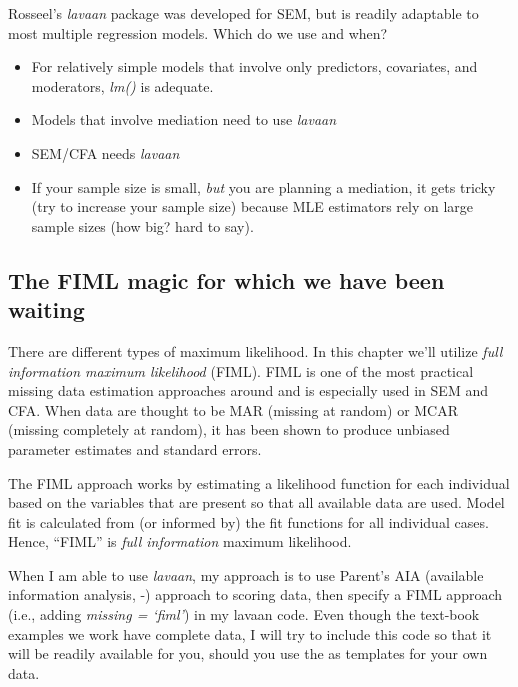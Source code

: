 \documentclass[
]{book}
\providecommand{\tightlist}{%
  \setlength{\itemsep}{0pt}\setlength{\parskip}{0pt}}
\begin{document}
Rosseel's \citeyearpar{rosseel_lavaan_2020} \emph{lavaan} package was developed for SEM, but is readily adaptable to most multiple regression models. Which do we use and when?

\begin{itemize}
\tightlist
\item
  For relatively simple models that involve only predictors, covariates, and moderators, \emph{lm()} is adequate.
\item
  Models that involve mediation need to use \emph{lavaan}
\item
  SEM/CFA needs \emph{lavaan}
\item
  If your sample size is small, \emph{but} you are planning a mediation, it gets tricky (try to increase your sample size) because MLE estimators rely on large sample sizes (how big? hard to say).
\end{itemize}

\hypertarget{the-fiml-magic-for-which-we-have-been-waiting}{%
\subsection{The FIML magic for which we have been waiting}\label{the-fiml-magic-for-which-we-have-been-waiting}}

There are different types of maximum likelihood. In this chapter we'll utilize \emph{full information maximum likelihood} (FIML). FIML is one of the most practical missing data estimation approaches around and is especially used in SEM and CFA. When data are thought to be MAR (missing at random) or MCAR (missing completely at random), it has been shown to produce unbiased parameter estimates and standard errors.

The FIML approach works by estimating a likelihood function for each individual based on the variables that are present so that all available data are used. Model fit is calculated from (or informed by) the fit functions for all individual cases. Hence, ``FIML'' is \emph{full information} maximum likelihood.

When I am able to use \emph{lavaan}, my approach is to use Parent's AIA (available information analysis, -\citet{parent_handling_2013}) approach to scoring data, then specify a FIML approach (i.e., adding \emph{missing = `fiml'}) in my lavaan code. Even though the text-book examples we work have complete data, I will try to include this code so that it will be readily available for you, should you use the as templates for your own data.
\end{document}
